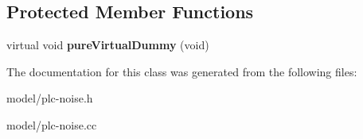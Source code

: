\subsection*{\-Protected \-Member \-Functions}
\begin{DoxyCompactItemize}
\item 
\hypertarget{classns3_1_1PLC__StaticNoiseSource_addaa95a59db7402ca0b52d404b2ba4fe}{virtual void {\bfseries pure\-Virtual\-Dummy} (void)}\label{classns3_1_1PLC__StaticNoiseSource_addaa95a59db7402ca0b52d404b2ba4fe}

\end{DoxyCompactItemize}


\-The documentation for this class was generated from the following files\-:\begin{DoxyCompactItemize}
\item 
model/plc-\/noise.\-h\item 
model/plc-\/noise.\-cc\end{DoxyCompactItemize}
